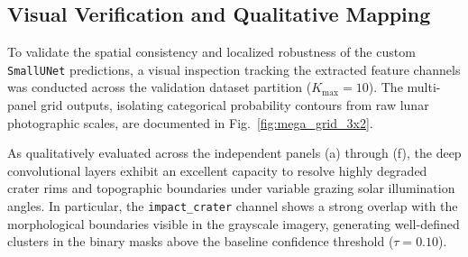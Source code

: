 \documentclass{aa}
\begin{document}
\subsection{Visual Verification and Qualitative Mapping}
To validate the spatial consistency and localized robustness of the custom \texttt{SmallUNet} predictions, a visual inspection tracking the extracted feature channels was conducted across the validation dataset partition ($K_{\text{max}} = 10$). The multi-panel grid outputs, isolating categorical probability contours from raw lunar photographic scales, are documented in Fig.~\ref{fig:mega_grid_3x2}.

As qualitatively evaluated across the independent panels (a) through (f), the deep convolutional layers exhibit an excellent capacity to resolve highly degraded crater rims and topographic boundaries under variable grazing solar illumination angles. In particular, the \texttt{impact\_crater} channel shows a strong overlap with the morphological boundaries visible in the grayscale imagery, generating well-defined clusters in the binary masks above the baseline confidence threshold ($\tau = 0.10$).
\end{document}
